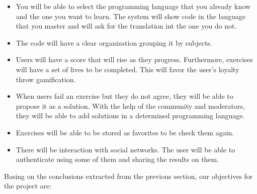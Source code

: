 \begin{itemize}
\item
You will be able to select the programming language that you already know and the one you want to learn. The system will show code in the language that you master and will ask for the translation int the one you do not.

\item
The code will have a clear organization grouping it by subjects.

\item
Users will have a score that will rise as they progress. Furthermore, exercises will have a set of lives to be completed. This will favor the user's loyalty throw gamification.

\item
When users fail an exercise but they do not agree, they will be able to propose it as a solution. With the help of the community and moderators, they will be able to add solutions in a determined programming language. 

\item
Exercises will be able to be stored as favorites to be check them again.

\item
There will be interaction with social networks. The user will be able to authenticate using some of them and sharing the results on them. 

\end{itemize}
Basing on the conclusions extracted from the previous section, our objectives for the project are:

